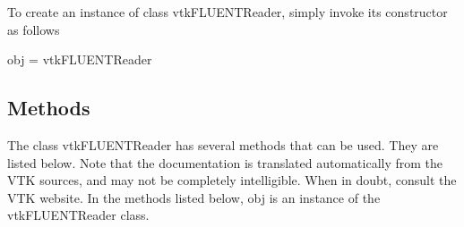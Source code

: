 To create an instance of class vtk\-F\-L\-U\-E\-N\-T\-Reader, simply invoke its constructor as follows \begin{DoxyVerb}  obj = vtkFLUENTReader
\end{DoxyVerb}
 \hypertarget{vtkwidgets_vtkxyplotwidget_Methods}{}\subsection{Methods}\label{vtkwidgets_vtkxyplotwidget_Methods}
The class vtk\-F\-L\-U\-E\-N\-T\-Reader has several methods that can be used. They are listed below. Note that the documentation is translated automatically from the V\-T\-K sources, and may not be completely intelligible. When in doubt, consult the V\-T\-K website. In the methods listed below, {\ttfamily obj} is an instance of the vtk\-F\-L\-U\-E\-N\-T\-Reader class. 
